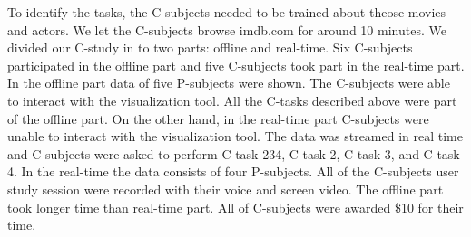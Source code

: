 To identify the tasks, the C-subjects needed to be trained about theose movies and actors. We let the C-subjects browse imdb.com for around 10 minutes. We divided our C-study in to two parts: offline and real-time. Six C-subjects participated in the offline part and five C-subjects took part in the real-time part. In the offline part data of five P-subjects were shown. The C-subjects were able to interact with the visualization tool. All the C-tasks described above were part of the offline part. On the other hand, in the real-time part C-subjects were unable to interact with the visualization tool. The data was streamed in real time and C-subjects were asked to perform C-task 234, C-task 2, C-task 3, and C-task 4. In the real-time the data consists of four P-subjects. All of the C-subjects user study session were recorded with their voice and screen video.  The offline part took longer time than real-time part. All of C-subjects were awarded \$10 for their time. 
